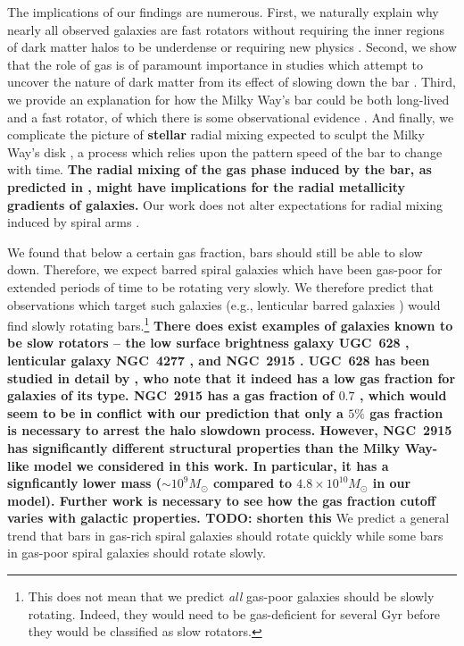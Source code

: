 \documentclass[twocolumn,linenumbers,trackchanges]{aastex631}
\newcommand{\Msun}{\ensuremath{M_{\odot}}}
\begin{document}
The implications of our findings are numerous. First, we naturally explain why
nearly all observed galaxies are fast rotators without requiring the inner
regions of dark matter halos to be underdense \citep{1998ApJ...493L...5D,
2000ApJ...543..704D} or requiring new physics \citep{2021MNRAS.503.2833R,
2021MNRAS.508..926R}. Second, we show that the role of gas is of paramount
importance in studies which attempt to uncover the nature of dark matter from
its effect of slowing down the bar \citep{2021MNRAS.500.4710C,
2021MNRAS.505.2412C}. Third, we provide an explanation for how the Milky Way's
bar could be both long-lived and a fast rotator, of which there is some
observational evidence \citep{2019MNRAS.490.4740B}. And finally, we complicate
the picture of {\bf stellar} radial mixing expected to sculpt the Milky Way's
disk \citep{2012MNRAS.420..913B, 2015ApJ...808..132H}, a process which relies
upon the pattern speed of the bar to change with time. {\bf The radial mixing of
the gas phase induced by the bar, as predicted in \citet{2011MNRAS.415.1027H},
might have implications for the radial metallicity gradients of galaxies.} Our
work does not alter expectations for radial mixing induced by spiral arms
\citep{2002MNRAS.336..785S}.

We found that below a certain gas fraction, bars should still be able to slow
down. Therefore, we expect barred spiral galaxies which have been gas-poor for
extended periods of time to be rotating very slowly. We therefore predict that
observations which target such galaxies (e.g., lenticular barred galaxies
\citep{2009ARAA..47..159B}) would find slowly rotating bars.\footnote{This does
not mean that we predict \textit{all} gas-poor galaxies should be slowly
rotating. Indeed, they would need to be gas-deficient for several $\textrm{Gyr}$
before they would be classified as slow rotators.} {\bf There does exist
examples of galaxies known to be slow rotators -- the low surface brightness
galaxy UGC~628 \citep{2009AA...499L..25C}, lenticular galaxy NGC~4277
\citep{2022AA...664L..10B}, and NGC~2915 \citep{1999AJ....118.2158B}. UGC~628
has been studied in detail by \citet{2016MNRAS.463.1751C}, who note that it
indeed has a low gas fraction for galaxies of its type. NGC~2915 has a gas
fraction of $0.7$ \citep{2010ApJ...715..656W}, which would seem to be in
conflict with our prediction that only a $5\%$ gas fraction is necessary to
arrest the halo slowdown process. However, NGC~2915 has significantly different
structural properties than the Milky Way-like model we considered in this work.
In particular, it has a signficantly lower mass ($\sim10^9\Msun$ compared to
$4.8\times10^{10}\Msun$ in our model). Further work is necessary to see how the
gas fraction cutoff varies with galactic properties. TODO: shorten this} We predict a general trend
that bars in gas-rich spiral galaxies should rotate quickly while some bars in
gas-poor spiral galaxies should rotate slowly.
\end{document}
